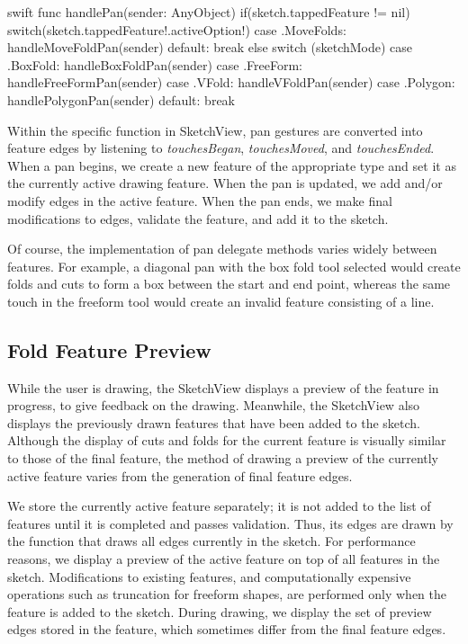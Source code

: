\small
\singlespacing 

\begin{pygmented}{swift}
    func handlePan(sender: AnyObject) {
        if(sketch.tappedFeature != nil){
            switch(sketch.tappedFeature!.activeOption!){
            case .MoveFolds:
                handleMoveFoldPan(sender)
            default: break
            }
        }
        else{
            switch (sketchMode) {
            case .BoxFold:
                handleBoxFoldPan(sender)
            case .FreeForm:
                handleFreeFormPan(sender)
            case .VFold:
                handleVFoldPan(sender)
            case .Polygon:
                handlePolygonPan(sender)
            default:
                break
            }
        }
    }
\end{pygmented}

\doublespacing
\normalsize

Within the specific function in SketchView, pan gestures are converted
into feature edges by listening to \emph{touchesBegan},
\emph{touchesMoved}, and \emph{touchesEnded}. When a pan begins, we
create a new feature of the appropriate type and set it as the currently
active drawing feature. When the pan is updated, we add and/or modify
edges in the active feature. When the pan ends, we make final
modifications to edges, validate the feature, and add it to the sketch.

Of course, the implementation of pan delegate methods varies widely
between features. For example, a diagonal pan with the box fold tool
selected would create folds and cuts to form a box between the start and
end point, whereas the same touch in the freeform tool would create an
invalid feature consisting of a line.

\subsection{Fold Feature Preview}\label{fold-feature-preview}

While the user is drawing, the SketchView displays a preview of the
feature in progress, to give feedback on the drawing. Meanwhile, the
SketchView also displays the previously drawn features that have been
added to the sketch. Although the display of cuts and folds for the
current feature is visually similar to those of the final feature, the
method of drawing a preview of the currently active feature varies from
the generation of final feature edges.

We store the currently active feature separately; it is not added to the
list of features until it is completed and passes validation. Thus, its
edges are drawn by the function that draws all edges currently in the
sketch. For performance reasons, we display a preview of the active
feature on top of all features in the sketch. Modifications to existing
features, and computationally expensive operations such as truncation
for freeform shapes, are performed only when the feature is added to the
sketch. During drawing, we display the set of preview edges stored in
the feature, which sometimes differ from the final feature edges.

